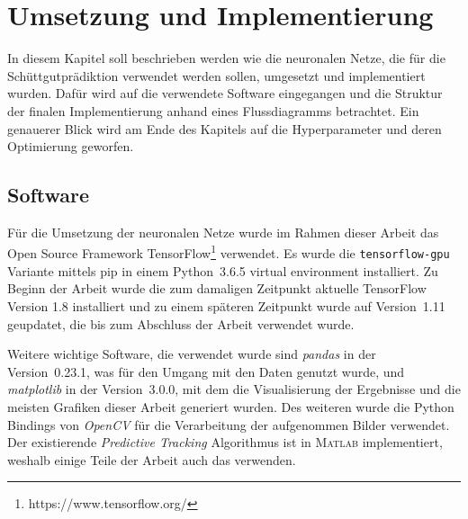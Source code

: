 \chapter{Umsetzung und Implementierung}

In diesem Kapitel soll beschrieben werden wie die neuronalen Netze, die für die Schüttgutprädiktion verwendet werden sollen,
umgesetzt und implementiert wurden.
Dafür wird auf die verwendete Software eingegangen und die Struktur der finalen Implementierung anhand eines Flussdiagramms betrachtet.
Ein genauerer Blick wird am Ende des Kapitels auf die Hyperparameter und deren Optimierung geworfen.



\section{Software}


Für die Umsetzung der neuronalen Netze wurde im Rahmen dieser Arbeit 
das Open Source Framework TensorFlow\footnote{https://www.tensorflow.org/} verwendet.
Es wurde die \texttt{tensorflow-gpu} Variante mittels pip in einem Python~3.6.5 virtual environment installiert.
Zu Beginn der Arbeit wurde die zum damaligen Zeitpunkt aktuelle TensorFlow Version 1.8 installiert 
und zu einem späteren Zeitpunkt wurde auf Version~1.11 geupdatet, die bis zum Abschluss der Arbeit verwendet wurde.

Weitere wichtige Software, die verwendet wurde 
sind \textit{pandas} in der Version~0.23.1, was für den Umgang mit den Daten genutzt wurde, 
und \textit{matplotlib} in der Version~3.0.0, mit dem die Visualisierung der Ergebnisse und die meisten Grafiken dieser Arbeit generiert wurden.
Des weiteren wurde die Python Bindings von \textit{OpenCV} für die Verarbeitung der aufgenommen Bilder verwendet.
Der existierende \textit{Predictive Tracking} Algorithmus ist in \textsc{Matlab} implementiert, 
weshalb einige Teile der Arbeit auch das verwenden.

